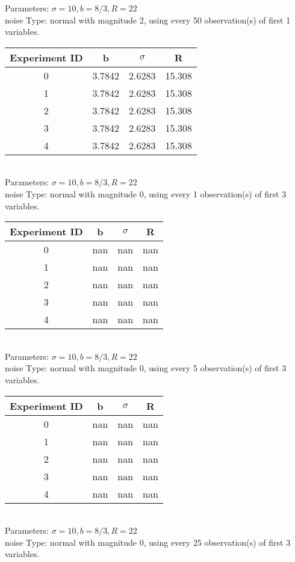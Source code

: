 \begin{multicols}{3}
Parameters: $\sigma=10, b=8/3, R=22$\\
noise Type: normal with magnitude 2, using every 50 observation(s) of first 1 variables.\\
\begin{tabular}{cccc}
\hline Experiment ID & b & $\sigma$ & R \\ \hline 
0 & 3.7842 & 2.6283 & 15.308\\ \hline 
 1 & 3.7842 & 2.6283 & 15.308\\ \hline 
 2 & 3.7842 & 2.6283 & 15.308\\ \hline 
 3 & 3.7842 & 2.6283 & 15.308\\ \hline 
 4 & 3.7842 & 2.6283 & 15.308\\ \hline 
 \end{tabular}\\
Parameters: $\sigma=10, b=8/3, R=22$\\
noise Type: normal with magnitude 0, using every 1 observation(s) of first 3 variables.\\
\begin{tabular}{cccc}
\hline Experiment ID & b & $\sigma$ & R \\ \hline 
0 & nan & nan & nan\\ \hline 
 1 & nan & nan & nan\\ \hline 
 2 & nan & nan & nan\\ \hline 
 3 & nan & nan & nan\\ \hline 
 4 & nan & nan & nan\\ \hline 
 \end{tabular}\\
Parameters: $\sigma=10, b=8/3, R=22$\\
noise Type: normal with magnitude 0, using every 5 observation(s) of first 3 variables.\\
\begin{tabular}{cccc}
\hline Experiment ID & b & $\sigma$ & R \\ \hline 
0 & nan & nan & nan\\ \hline 
 1 & nan & nan & nan\\ \hline 
 2 & nan & nan & nan\\ \hline 
 3 & nan & nan & nan\\ \hline 
 4 & nan & nan & nan\\ \hline 
 \end{tabular}\\
Parameters: $\sigma=10, b=8/3, R=22$\\
noise Type: normal with magnitude 0, using every 25 observation(s) of first 3 variables.\\

\end{multicols}
